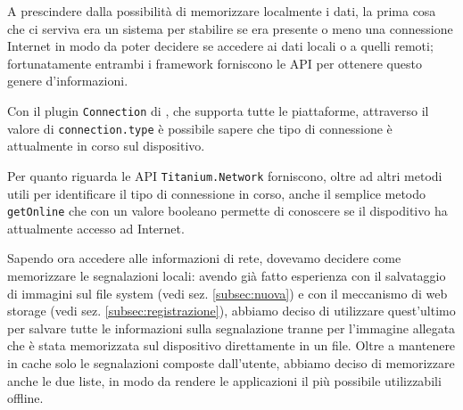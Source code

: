             A prescindere dalla possibilità di memorizzare localmente i dati,
            la prima cosa che ci serviva era un sistema per stabilire se era
            presente o meno una connessione Internet in modo da poter
            decidere se accedere ai dati locali o a quelli remoti;
            fortunatamente entrambi i framework forniscono le API per ottenere
            questo genere d'informazioni.

            Con il plugin \texttt{Connection} di \pg{}, che supporta tutte le
            piattaforme, attraverso il valore di \texttt{connection.type} è
            possibile sapere che tipo di connessione è attualmente in corso
            sul dispositivo.

            Per quanto riguarda \tisdk{} le API \texttt{Titanium.Network}
            forniscono, oltre ad altri metodi utili per identificare il tipo di
            connessione in corso, anche il semplice metodo \texttt{getOnline}
            che con un valore booleano permette di conoscere se il dispoditivo
            ha attualmente accesso ad Internet.

            Sapendo ora accedere alle informazioni di rete, dovevamo decidere
            come memorizzare le segnalazioni locali: avendo già fatto
            esperienza con il salvataggio di immagini sul file system (vedi
            sez. \ref{subsec:nuova}) e con il meccanismo di web
            storage (vedi sez. \ref{subsec:registrazione}), abbiamo deciso di
            utilizzare quest'ultimo per salvare tutte le informazioni sulla
            segnalazione tranne per l'immagine allegata che è stata memorizzata
            sul dispositivo direttamente in un file. Oltre a mantenere in cache
            solo le segnalazioni composte dall'utente, abbiamo deciso di
            memorizzare anche le due liste, in modo da rendere le applicazioni
            il più possibile utilizzabili offline.

